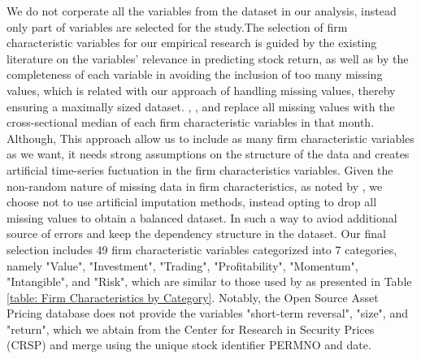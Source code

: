 We do not corperate all the variables from the dataset in our analysis, instead only part of variables are selected for the study.The selection of firm characteristic variables for our empirical research is guided by the existing literature on the variables' relevance in predicting stock return, as well as by the completeness of each variable in avoiding the inclusion of too many missing values, which is related with our approach of handling missing values, thereby ensuring a maximally sized dataset. \citet*{gu2020empirical}, \citet*{leippold2022machine}, and \citet*{drobetz2021empirical} replace all missing values with the cross-sectional median of each firm characteristic variables in that month. Although, This approach allow us to include as many firm characteristic variables as we want, it needs strong assumptions on the structure of the data and creates artificial time-series fuctuation in the firm characteristics variables. Given the non-random nature of missing data in firm characteristics, as noted by \citet*{bryzgalova2022missing}, we choose not to use artificial imputation methods, instead opting to drop all missing values to obtain a balanced dataset. In such a way to aviod additional source of errors and keep the dependency structure in the dataset. Our final selection includes 49 firm characteristic variables categorized into 7 categories, namely "Value", "Investment", "Trading", "Profitability", "Momentum", "Intangible", and "Risk", which are similar to those used by \citet*{chen2019deep} as presented in Table \ref{table: Firm Characteristics by Category}. Notably, the Open Source Asset Pricing database does not provide the variables "short-term reversal", "size", and "return", which we abtain from the Center for Research in Security Prices (CRSP) and merge using the unique stock identifier PERMNO and date.

